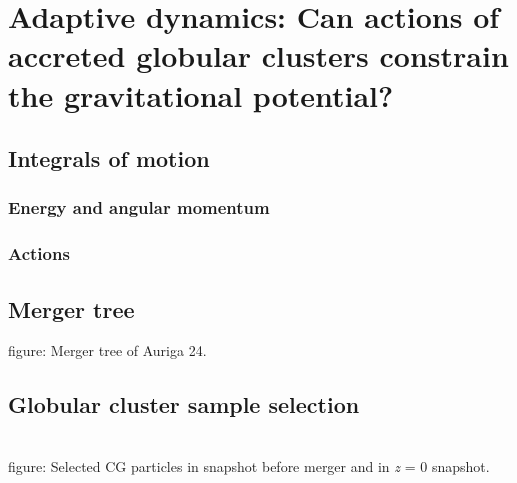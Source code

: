 \section{Adaptive dynamics: Can actions of accreted globular clusters constrain the gravitational potential?}
\subsection{Integrals of motion}

\subsubsection{Energy and angular momentum}
\subsubsection{Actions}
\subsection{Merger tree}
figure: Merger tree of Auriga 24. 
\subsection{Globular cluster sample selection}
\\figure: Selected CG particles in snapshot before merger and in \textit{z} = 0 snapshot.

